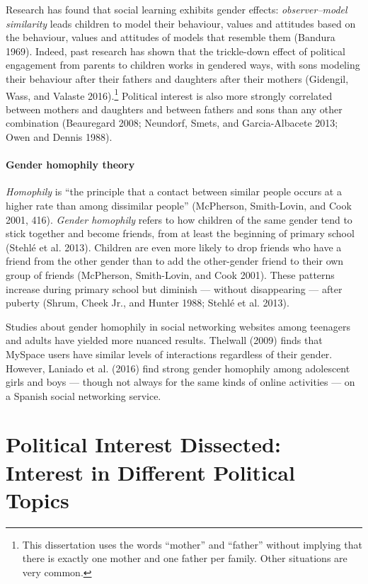 \documentclass[
  letterpaper,
  DIV=11,
  numbers=noendperiod]{scrreprt}
\let\oldparagraph\paragraph
\renewcommand{\paragraph}[1]{\oldparagraph{#1}\mbox{}}
\begin{document}
Research has found that social learning exhibits gender effects:
\emph{observer--model similarity} leads children to model their
behaviour, values and attitudes based on the behaviour, values and
attitudes of models that resemble them (Bandura 1969). Indeed, past
research has shown that the trickle-down effect of political engagement
from parents to children works in gendered ways, with sons modeling
their behaviour after their fathers and daughters after their mothers
(Gidengil, Wass, and Valaste 2016).\footnote{This dissertation uses the
  words ``mother'' and ``father'' without implying that there is exactly
  one mother and one father per family. Other situations are very
  common.} Political interest is also more strongly correlated between
mothers and daughters and between fathers and sons than any other
combination (Beauregard 2008; Neundorf, Smets, and Garcia-Albacete 2013;
Owen and Dennis 1988).

\paragraph{Gender homophily theory}\label{gender-homophily-theory}

\emph{Homophily} is ``the principle that a contact between similar
people occurs at a higher rate than among dissimilar people''
(McPherson, Smith-Lovin, and Cook 2001, 416). \emph{Gender homophily}
refers to how children of the same gender tend to stick together and
become friends, from at least the beginning of primary school (Stehlé et
al. 2013). Children are even more likely to drop friends who have a
friend from the other gender than to add the other-gender friend to
their own group of friends (McPherson, Smith-Lovin, and Cook 2001).
These patterns increase during primary school but diminish --- without
disappearing --- after puberty (Shrum, Cheek Jr., and Hunter 1988;
Stehlé et al. 2013).

Studies about gender homophily in social networking websites among
teenagers and adults have yielded more nuanced results. Thelwall (2009)
finds that MySpace users have similar levels of interactions regardless
of their gender. However, Laniado et al. (2016) find strong gender
homophily among adolescent girls and boys --- though not always for the
same kinds of online activities --- on a Spanish social networking
service.

\section{Political Interest Dissected: Interest in Different Political
Topics}\label{political-interest-dissected-interest-in-different-political-topics}
\end{document}
